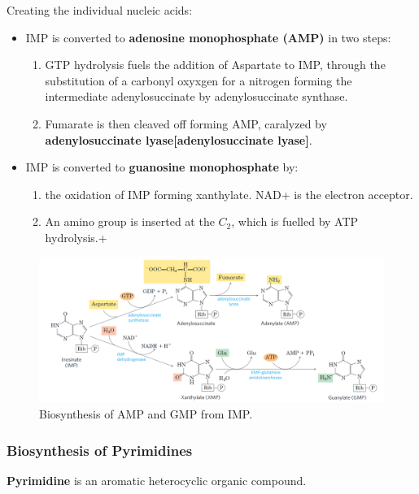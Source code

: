 \documentclass[../main.tex]{subfiles}
\begin{document}
Creating the individual nucleic acids:

\begin{itemize}
	\item IMP is converted to \textbf{\gls{adenosine monophosphate (AMP)}} in two steps:
	\begin{enumerate}
		\item GTP hydrolysis fuels the addition of Aspartate to IMP, through the substitution of a carbonyl oxyxgen for a nitrogen forming the intermediate adenylosuccinate by adenylosuccinate synthase.
		\item Fumarate is then cleaved off forming AMP, caralyzed by \textbf{\gls{adenylosuccinate lyase}[adenylosuccinate lyase]}.
	\end{enumerate}
	\item IMP is converted to \textbf{\gls{guanosine monophosphate}} by:
	\begin{enumerate}
		\item the oxidation of IMP forming xanthylate. NAD+ is the electron acceptor.
		\item An amino group is inserted at the $C_{2}$, which is fuelled by ATP hydrolysis.+
	\end{enumerate}
\end{itemize}

\begin{figure}[H]
	\centering
	\includegraphics[width=0.8\linewidth]{puri_path2}
	\caption{Biosynthesis of AMP and GMP from IMP.}
	\label{fig:puripath2}
\end{figure}


\subsubsection{Biosynthesis of Pyrimidines}

\textbf{\gls{Pyrimidine}} is an aromatic heterocyclic organic compound.
\end{document}
